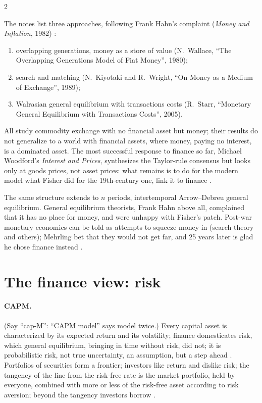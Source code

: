 \begin{paracol}{2}
\begin{secondary}
The notes list three approaches, following Frank Hahn's complaint (\emph{Money and Inflation}, 1982) :
\begin{enumerate}
  \item overlapping generations, money as a store of value (N.~Wallace, ``The Overlapping Generations Model of Fiat Money'', 1980);
  \item search and matching (N.~Kiyotaki and R.~Wright, ``On Money as a Medium of Exchange'', 1989);
  \item Walrasian general equilibrium with transactions costs (R.~Starr, ``Monetary General Equilibrium with Transactions Costs'', 2005).
\end{enumerate}
All study commodity exchange with no financial asset but money; their results do not generalize to a world with financial assets, where money, paying no interest, is a dominated asset. The
most successful response to finance so far, Michael Woodford's \emph{Interest and Prices}, synthesizes the Taylor-rule consensus but looks only at goods prices, not asset prices: what remains is to do
for the modern model what Fisher did for the 19th-century one, link it to finance .
\end{secondary}

\begin{intuition}[A patch]
The same structure extends to $n$ periods, intertemporal Arrow--Debreu general equilibrium. General equilibrium theorists, Frank Hahn above all, complained that it has no place
for money, and were unhappy with Fisher's patch. Post-war monetary economics can be told as attempts to squeeze money in (search theory and others); Mehrling bet that they
would not get far, and 25 years later is glad he chose finance instead .
\end{intuition}

\section{The finance view: risk}\label{sec:tv-finance}

\paragraph{CAPM.} (Say ``cap-M'': ``CAPM model'' says model twice.) Every capital asset is characterized by its expected return and its volatility; finance domesticates risk,
which general equilibrium, bringing in time without risk, did not; it is probabilistic risk, not true uncertainty, an assumption, but a step ahead
. Portfolios of securities form a frontier; investors like return and dislike
risk; the tangency of the line from the risk-free rate is the market portfolio, held by everyone, combined with more or less of the risk-free asset according to risk aversion;
beyond the tangency investors borrow .


\end{paracol}
